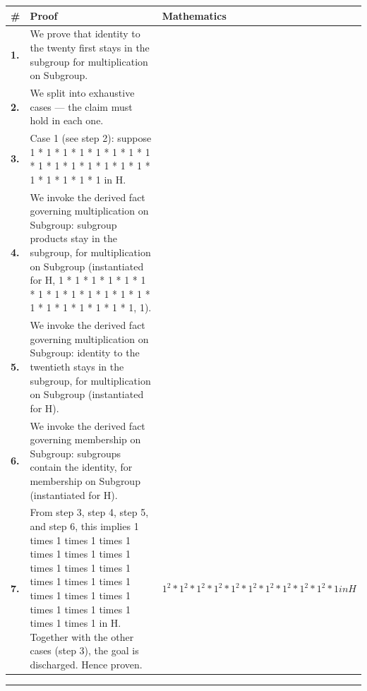 \documentclass[11pt]{article}
\theoremstyle{definition}
\begin{document}
\begin{tabular}{@{} >{\raggedright\arraybackslash}p{} >{\raggedright\arraybackslash}p{} >{\raggedleft\arraybackslash}p{} @{}}
\textbf{\#} & \textbf{Proof} & \textbf{Mathematics} \\
\midrule
\textbf{1.} & We prove that identity to the twenty first stays in the subgroup for multiplication on Subgroup. & \\[0.45em]
\textbf{2.} & We split into exhaustive cases — the claim must hold in each one. & \\[0.45em]
\textbf{3.} & Case 1 (see step 2): suppose 1 * 1 * 1 * 1 * 1 * 1 * 1 * 1 * 1 * 1 * 1 * 1 * 1 * 1 * 1 * 1 * 1 * 1 * 1 * 1 in H. & \\[0.45em]
\textbf{4.} & We invoke the derived fact governing multiplication on Subgroup: subgroup products stay in the subgroup, for multiplication on Subgroup (instantiated for H, 1 * 1 * 1 * 1 * 1 * 1 * 1 * 1 * 1 * 1 * 1 * 1 * 1 * 1 * 1 * 1 * 1 * 1 * 1 * 1, 1). & \\[0.45em]
\textbf{5.} & We invoke the derived fact governing multiplication on Subgroup: identity to the twentieth stays in the subgroup, for multiplication on Subgroup (instantiated for H). & \\[0.45em]
\textbf{6.} & We invoke the derived fact governing membership on Subgroup: subgroups contain the identity, for membership on Subgroup (instantiated for H). & \\[0.45em]
\textbf{7.} & From step 3, step 4, step 5, and step 6, this implies 1 times 1 times 1 times 1 times 1 times 1 times 1 times 1 times 1 times 1 times 1 times 1 times 1 times 1 times 1 times 1 times 1 times 1 times 1 times 1 times 1 in H. Together with the other cases (step 3), the goal is discharged. Hence proven. & $\displaystyle 1^{2} * 1^{2} * 1^{2} * 1^{2} * 1^{2} * 1^{2} * 1^{2} * 1^{2} * 1^{2} * 1^{2} * 1 in H$ \\[0.45em]
\bottomrule
\end{tabular}
\label{thm:Subgroup-multiplication-identity_to_the_twenty_first_stays_in_the_subgroup}
\par\medskip\hrule
\end{document}
